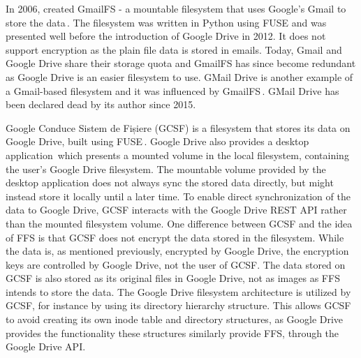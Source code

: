 In 2006, \citeauthor{jonesGoogleHackUse2006} created GmailFS - a mountable filesystem that uses Google's Gmail to store the data\,\cite{jonesGoogleHackUse2006, jonesGmailFilesystemImplementation2006}. The filesystem was written in Python using FUSE and was presented well before the introduction of Google Drive in 2012. It does not support encryption as the plain file data is stored in emails. Today, Gmail and Google Drive share their storage quota and GmailFS has since become redundant as Google Drive is an easier filesystem to use. GMail Drive is another example of a Gmail-based filesystem and it was influenced by GmailFS\,\cite{viksoeViksoeDkGMail2004}. GMail Drive has been declared dead by its author since 2015.

Google Conduce Sistem de Fișiere (\gls{GCSF}) is a filesystem that stores its data on Google Drive, built using FUSE\,\cite{puscassergiudanGCSFVIRTUALFILE2018,puscasHarababurelGcsf2022}. Google Drive also provides a desktop application\,\cite{googleInstallSetGoogle} which presents a mounted volume in the local filesystem, containing the user's Google Drive filesystem. The mountable volume provided by the desktop application does not always sync the stored data directly, but might instead store it locally until a later time. To enable direct synchronization of the data to Google Drive, GCSF interacts with the Google Drive REST API rather than the mounted filesystem volume. One difference between GCSF and the idea of FFS is that GCSF does not encrypt the data stored in the filesystem. While the data is, as mentioned previously, encrypted by Google Drive, the encryption keys are controlled by Google Drive, not the user of GCSF. The data stored on GCSF is also stored as its original files in Google Drive, not as images as FFS intends to store the data. The Google Drive filesystem architecture is utilized by GCSF, for instance by using its directory hierarchy structure. This allows GCSF to avoid creating its own inode table and directory structures, as Google Drive provides the functionality these structures similarly provide FFS, through the Google Drive API.

